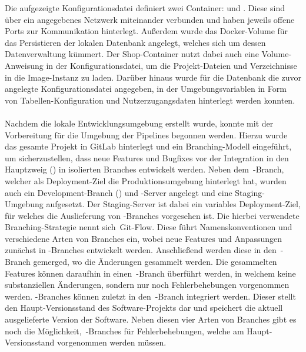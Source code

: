 Die aufgezeigte Konfigurationsdatei definiert zwei Container:  und .
Diese sind über ein angegebenes Netzwerk  miteinander verbunden und haben jeweils offene Ports zur
Kommunikation hinterlegt.
Außerdem wurde das Docker-Volume  für das Persistieren der lokalen Datenbank angelegt,
welches sich um dessen Datenverwaltung kümmert.
Der Shop-Container nutzt dabei auch eine Volume-Anweisung in der Konfigurationsdatei, um die Projekt-Dateien und
Verzeichnisse in die Image-Instanz zu laden.
Darüber hinaus wurde für die Datenbank die zuvor angelegte Konfigurationsdatei  angegeben, in der
Umgebungsvariablen in Form von Tabellen-Konfiguration und Nutzerzugangsdaten hinterlegt werden konnten.
\\\\
Nachdem die lokale Entwicklungsumgebung erstellt wurde, konnte mit der Vorbereitung für die Umgebung der Pipelines
begonnen werden.
Hierzu wurde das gesamte Projekt in GitLab hinterlegt und ein Branching-Modell eingeführt, um sicherzustellen, dass
neue Features und Bugfixes vor der Integration in den Hauptzweig () in isolierten Branches entwickelt
werden.
Neben dem\ -Branch, welcher als Deployment-Ziel die Produktionsumgebung hinterlegt hat, wurden auch
ein Development-Branch () und -Server angelegt und eine Staging-Umgebung aufgesetzt.
Der Staging-Server ist dabei ein variables Deployment-Ziel, für welches die Auslieferung von
-Branches vorgesehen ist.
Die hierbei verwendete Branching-Strategie nennt sich\ \glqq Git-Flow\grqq.
Diese führt Namenskonventionen und verschiedene Arten von Branches ein, wobei neue Features und Anpassungen zunächst in
-Branches entwickelt werden.
Anschließend werden diese in den\ -Branch gemerged, wo die Änderungen gesammelt werden.
Die gesammelten Features können daraufhin in einen\ -Branch überführt werden, in welchem keine
substanziellen Änderungen, sondern nur noch Fehlerbehebungen vorgenommen werden.
-Branches können zuletzt in den\ -Branch integriert werden.
Dieser stellt den Haupt-Versionsstand des Software-Projekts dar und speichert die aktuell ausgelieferte Version der
Software.
Neben diesen vier Arten von Branches gibt es noch die Möglichkeit,\ -Branches für Fehlerbehebungen,
welche am Haupt-Versionsstand vorgenommen werden müssen.

